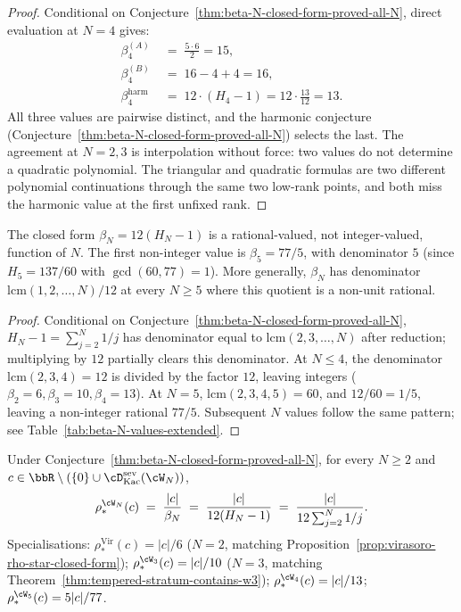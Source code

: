 \begin{proof}
Conditional on Conjecture~\ref{thm:beta-N-closed-form-proved-all-N},
direct evaluation at $N = 4$ gives:
\begin{align*}
 \beta_4^{(A)} &\;=\; \tfrac{5 \cdot 6}{2} = 15, \\
 \beta_4^{(B)} &\;=\; 16 - 4 + 4 = 16, \\
 \beta_4^{\mathrm{harm}} &\;=\; 12 \cdot (H_4 - 1)
 = 12 \cdot \tfrac{13}{12}
 = 13.
\end{align*}
All three values are pairwise distinct, and the harmonic conjecture
(Conjecture~\ref{thm:beta-N-closed-form-proved-all-N}) selects
the last. The agreement at $N = 2, 3$ is interpolation without force:
two values do not determine a quadratic polynomial. The triangular and
quadratic formulas are two different polynomial continuations through
the same two low-rank points, and both miss the harmonic value at the
first unfixed rank.
\end{proof}

\begin{corollary}
\label{cor:beta-N-rational-not-integer}
\ClaimStatusConditional
The closed form $\beta_N = 12(H_N - 1)$ is a rational-valued, not
integer-valued, function of $N$. The first non-integer value is
$\beta_5 = 77/5$, with denominator $5$ (since $H_5 = 137/60$ with
$\gcd(60, 77) = 1$). More generally, $\beta_N$ has denominator
$\mathrm{lcm}(1, 2, \ldots, N) / 12$ at every $N \ge 5$ where this
quotient is a non-unit rational.
\end{corollary}

\begin{proof}
Conditional on Conjecture~\ref{thm:beta-N-closed-form-proved-all-N},
$H_N - 1 = \sum_{j = 2}^{N} 1/j$ has denominator equal to
$\mathrm{lcm}(2, 3, \ldots, N)$ after reduction; multiplying by $12$
partially clears this denominator. At $N \le 4$, the denominator
$\mathrm{lcm}(2, 3, 4) = 12$ is divided by the factor $12$, leaving
integers ($\beta_2 = 6, \beta_3 = 10, \beta_4 = 13$). At $N = 5$,
$\mathrm{lcm}(2, 3, 4, 5) = 60$, and $12/60 = 1/5$, leaving a
non-integer rational $77/5$. Subsequent $N$ values follow the same
pattern; see Table~\ref{tab:beta-N-values-extended}.
\end{proof}

\begin{proposition}
\label{prop:rho-star-WN-closed-form-upgrade}
\ClaimStatusConditional
Under Conjecture~\ref{thm:beta-N-closed-form-proved-all-N}, for every
$N \ge 2$ and $c \in \bbR \setminus (\{0\} \cup \cD^{\mathrm{sev}}_{\mathrm{Kac}}(\cW_N))$,
\[
 \rho_*^{\cW_N}(c)
 \;=\;
 \frac{\lvert c \rvert}{\beta_N}
 \;=\;
 \frac{\lvert c \rvert}{12 (H_N - 1)}
 \;=\;
 \frac{\lvert c \rvert}{12 \sum_{j = 2}^{N} 1/j}.
\]
Specialisations:
$\rho_*^{\mathrm{Vir}}(c) = |c|/6$ ($N=2$, matching
Proposition~\ref{prop:virasoro-rho-star-closed-form});
$\rho_*^{\cW_3}(c) = |c|/10$ ($N=3$, matching
Theorem~\ref{thm:tempered-stratum-contains-w3});
$\rho_*^{\cW_4}(c) = |c|/13$;
$\rho_*^{\cW_5}(c) = 5|c|/77$.
\end{proposition}

